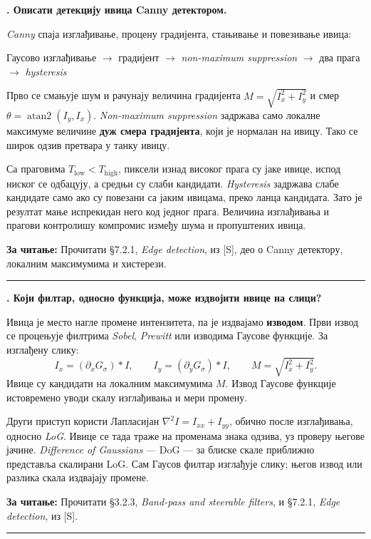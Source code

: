 \documentclass[10pt,a4paper]{article}
\newcommand{\en}[1]{\textit{#1}}
\newcounter{pitanje}
\newenvironment{odgovor}[1]{\stepcounter{pitanje}\begin{minipage}[t][0.455\textheight][t]{\textwidth}\vspace{0pt}\textbf{\thepitanje. #1}\par\smallskip}{\end{minipage}\par\ifodd\value{pitanje}\vspace{0.025\textheight}\hrule\vspace{0.015\textheight}\else\newpage\fi}
\newcommand{\izvor}[1]{\par\vfill{\footnotesize\textbf{За читање:} #1}\par}
\newcommand{\lanac}[1]{\begin{center}\small #1\end{center}}
\begin{document}
\begin{odgovor}{Описати детекцију ивица Canny детектором.}
\en{Canny} спаја изглађивање, процену градијента, стањивање и повезивање ивица:
\lanac{Гаусово изглађивање $\to$ градијент $\to$ \en{non-maximum suppression} $\to$ два прага $\to$ \en{hysteresis}}
Прво се смањује шум и рачунају величина градијента $M=\sqrt{I_x^2+I_y^2}$ и смер $\theta=\operatorname{atan2}(I_y,I_x)$. \en{Non-maximum suppression} задржава само локалне максимуме величине \textbf{дуж смера градијента}, који је нормалан на ивицу. Тако се широк одзив претвара у танку ивицу.

Са праговима $T_{\mathrm{low}}<T_{\mathrm{high}}$, пиксели изнад високог прага су јаке ивице, испод ниског се одбацују, а средњи су слаби кандидати. \en{Hysteresis} задржава слабе кандидате само ако су повезани са јаким ивицама, преко ланца кандидата. Зато је резултат мање испрекидан него код једног прага. Величина изглађивања и прагови контролишу компромис између шума и пропуштених ивица.
\izvor{Прочитати §7.2.1, \en{Edge detection}, из [S], део о Canny детектору, локалним максимумима и хистерези.}
\end{odgovor}

\begin{odgovor}{Који филтар, односно функција, може издвојити ивице на слици?}
Ивица је место нагле промене интензитета, па је издвајамо \textbf{изводом}. Први извод се процењује филтрима \en{Sobel}, \en{Prewitt} или изводима Гаусове функције. За изглађену слику:
\[
I_x=(\partial_xG_\sigma)*I,\qquad I_y=(\partial_yG_\sigma)*I,\qquad M=\sqrt{I_x^2+I_y^2}.
\]
Ивице су кандидати на локалним максимумима $M$. Извод Гаусове функције истовремено уводи скалу изглађивања и мери промену.

Други приступ користи Лапласијан $\nabla^2I=I_{xx}+I_{yy}$, обично после изглађивања, односно \en{LoG}. Ивице се тада траже на променама знака одзива, уз проверу његове јачине. \en{Difference of Gaussians} — DoG — за блиске скале приближно представља скалирани LoG. Сам Гаусов филтар изглађује слику; његов извод или разлика скала издвајају промене.
\izvor{Прочитати §3.2.3, \en{Band-pass and steerable filters}, и §7.2.1, \en{Edge detection}, из [S].}
\end{odgovor}
\end{document}
